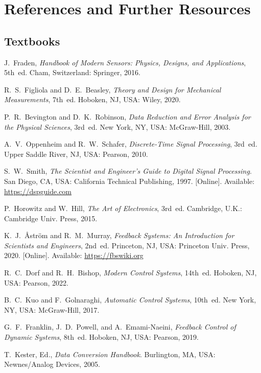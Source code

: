
\chapter*{References and Further Resources}

\section*{Textbooks}

\begin{enumerate}[label={[\arabic*]},leftmargin=2em]
\item J.~Fraden, \emph{Handbook of Modern Sensors: Physics, Designs, and Applications}, 5th~ed. Cham, Switzerland: Springer, 2016.
\item R.~S.~Figliola and D.~E.~Beasley, \emph{Theory and Design for Mechanical Measurements}, 7th~ed. Hoboken, NJ, USA: Wiley, 2020.
\item P.~R.~Bevington and D.~K.~Robinson, \emph{Data Reduction and Error Analysis for the Physical Sciences}, 3rd~ed. New York, NY, USA: McGraw-Hill, 2003.
\item A.~V.~Oppenheim and R.~W.~Schafer, \emph{Discrete-Time Signal Processing}, 3rd~ed. Upper Saddle River, NJ, USA: Pearson, 2010.
\item S.~W.~Smith, \emph{The Scientist and Engineer's Guide to Digital Signal Processing}. San Diego, CA, USA: California Technical Publishing, 1997. [Online]. Available: \url{https://dspguide.com}
\item P.~Horowitz and W.~Hill, \emph{The Art of Electronics}, 3rd~ed. Cambridge, U.K.: Cambridge Univ. Press, 2015.
\item K.~J.~{\AA}str{\"o}m and R.~M.~Murray, \emph{Feedback Systems: An Introduction for Scientists and Engineers}, 2nd~ed. Princeton, NJ, USA: Princeton Univ. Press, 2020. [Online]. Available: \url{https://fbswiki.org}
\item R.~C.~Dorf and R.~H.~Bishop, \emph{Modern Control Systems}, 14th~ed. Hoboken, NJ, USA: Pearson, 2022.
\item B.~C.~Kuo and F.~Golnaraghi, \emph{Automatic Control Systems}, 10th~ed. New York, NY, USA: McGraw-Hill, 2017.
\item G.~F.~Franklin, J.~D.~Powell, and A.~Emami-Naeini, \emph{Feedback Control of Dynamic Systems}, 8th~ed. Hoboken, NJ, USA: Pearson, 2019.
\item T.~Kester, Ed., \emph{Data Conversion Handbook}. Burlington, MA, USA: Newnes/Analog Devices, 2005.

\end{enumerate}
